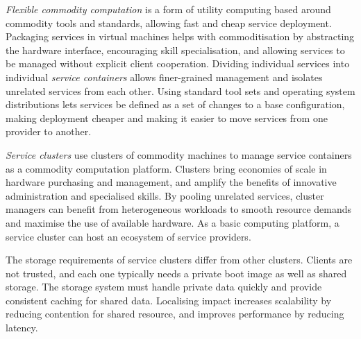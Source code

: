 \emph{Flexible commodity computation} is a form of utility computing based around commodity tools and standards, allowing fast and cheap service deployment. Packaging services in virtual machines helps with commoditisation by abstracting the hardware interface, encouraging skill specialisation, and allowing services to be managed without explicit client cooperation. Dividing individual services into individual \emph{service containers} allows finer-grained management and isolates unrelated services from each other. Using standard tool sets and operating system distributions lets services be defined as a set of changes to a base configuration, making deployment cheaper and making it easier to move services from one provider to another.

\emph{Service clusters} use clusters of commodity machines to manage service containers as a commodity computation platform. Clusters bring economies of scale in hardware purchasing and management, and amplify the benefits of innovative administration and specialised skills. By pooling unrelated services, cluster managers can benefit from heterogeneous workloads to smooth resource demands and maximise the use of available hardware. As a basic computing platform, a service cluster can host an ecosystem of service providers.

The storage requirements of service clusters differ from other clusters. Clients are not trusted, and each one typically needs a private boot image as well as shared storage. The storage system must handle private data quickly and provide consistent caching for shared data. Localising impact increases scalability by reducing contention for shared resource, and improves performance by reducing latency.
